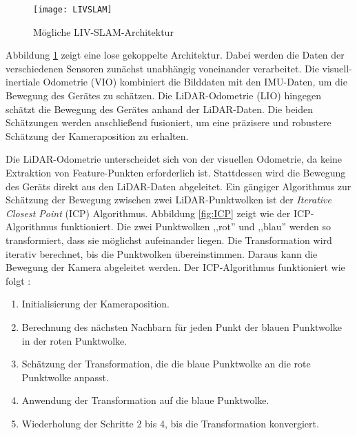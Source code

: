 \begin{figure}
    \centering
    \texttt{[image: LIVSLAM]}
    \caption{Mögliche LIV-SLAM-Architektur \cite{zhang2024lidarslam}\label{fig:LIVSLAM}}\par
\end{figure}

Abbildung \ref{fig:LIVSLAM} zeigt eine lose gekoppelte Architektur. Dabei werden die Daten der verschiedenen Sensoren zunächst unabhängig voneinander verarbeitet. Die visuell-inertiale Odometrie (VIO) kombiniert die Bilddaten mit den IMU-Daten, um die Bewegung des Gerätes zu schätzen. Die LiDAR-Odometrie (LIO) hingegen schätzt die Bewegung des Gerätes anhand der LiDAR-Daten. Die beiden Schätzungen werden anschließend fusioniert, um eine präzisere und robustere Schätzung der Kameraposition zu erhalten. \cite{zhang2024lidarslam}

Die LiDAR-Odometrie unterscheidet sich von der visuellen Odometrie, da keine Extraktion von Feature-Punkten erforderlich ist. Stattdessen wird die Bewegung des Geräts direkt aus den LiDAR-Daten abgeleitet. Ein gängiger Algorithmus zur Schätzung der Bewegung zwischen zwei LiDAR-Punktwolken ist der \emph{Iterative Closest Point} (ICP) Algorithmus. Abbildung \ref{fig:ICP} zeigt wie der ICP-Algorithmus funktioniert. Die zwei Punktwolken ,,rot'' und ,,blau'' werden so transformiert, dass sie möglichst aufeinander liegen. Die Transformation wird iterativ berechnet, bis die Punktwolken übereinstimmen. Daraus kann die Bewegung der Kamera abgeleitet werden. Der ICP-Algorithmus funktioniert wie folgt \cite{gao2021vSLAM, bogoslavskyi2017icp}:

\begin{enumerate}
    \item Initialisierung der Kameraposition.
    \item Berechnung des nächsten Nachbarn für jeden Punkt der blauen Punktwolke in der roten Punktwolke.
    \item Schätzung der Transformation, die die blaue Punktwolke an die rote Punktwolke anpasst.
    \item Anwendung der Transformation auf die blaue Punktwolke.
    \item Wiederholung der Schritte 2 bis 4, bis die Transformation konvergiert.
\end{enumerate}

